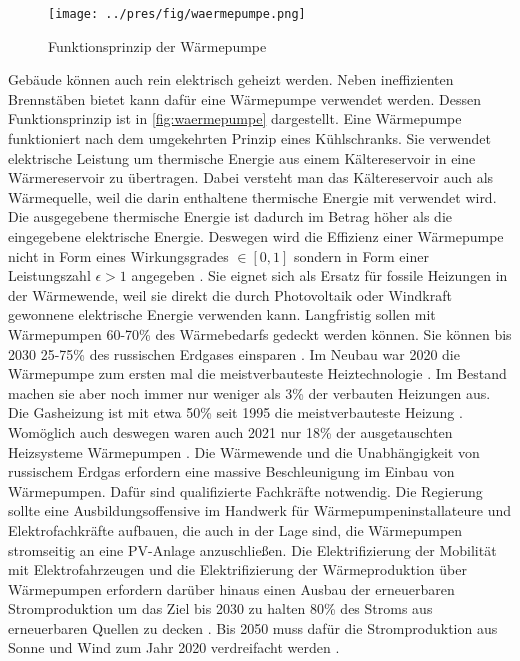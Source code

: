 \begin{figure}
\centering
\texttt{[image: ../pres/fig/waermepumpe.png]}
\caption{Funktionsprinzip der Wärmepumpe \cite{ei1}}
\label{fig:waermepumpe}
\end{figure}

Gebäude können auch rein elektrisch geheizt werden. Neben ineffizienten Brennstäben bietet kann dafür eine Wärmepumpe verwendet werden. Dessen Funktionsprinzip ist in \autoref{fig:waermepumpe} dargestellt. Eine Wärmepumpe funktioniert nach dem umgekehrten Prinzip eines Kühlschranks. Sie verwendet elektrische Leistung um thermische Energie aus einem Kältereservoir in eine Wärmereservoir zu übertragen. Dabei versteht man das Kältereservoir auch als Wärmequelle, weil die darin enthaltene thermische Energie mit verwendet wird. Die ausgegebene thermische Energie ist dadurch im Betrag höher als die eingegebene elektrische Energie. Deswegen wird die Effizienz einer Wärmepumpe nicht in Form eines Wirkungsgrades $\in [0,1]$ sondern in Form einer Leistungszahl $\epsilon > 1$ angegeben \cite{ei1}. Sie eignet sich als Ersatz für fossile Heizungen in der Wärmewende, weil sie direkt die durch Photovoltaik oder Windkraft gewonnene elektrische Energie verwenden kann. Langfristig sollen mit Wärmepumpen 60-70\% des Wärmebedarfs gedeckt werden können. Sie können bis 2030 25-75\% des russischen Erdgases einsparen \cite{clausen2022}. Im Neubau war 2020 die Wärmepumpe zum ersten mal die meistverbauteste Heiztechnologie \cite{statista-neubau-heizung}. Im Bestand machen sie aber noch immer nur weniger als 3\% der verbauten Heizungen aus. Die Gasheizung ist mit etwa 50\% seit 1995 die meistverbauteste Heizung \cite{statista-bestand-heizung}. Womöglich auch deswegen waren auch 2021 nur 18\% der ausgetauschten Heizsysteme Wärmepumpen \cite{clausen2022}. 
Die Wärmewende und die Unabhängigkeit von russischem Erdgas erfordern eine massive Beschleunigung im Einbau von Wärmepumpen. Dafür sind qualifizierte Fachkräfte notwendig. Die Regierung sollte eine Ausbildungsoffensive im Handwerk für Wärmepumpeninstallateure und Elektrofachkräfte aufbauen, die auch in der Lage sind, die Wärmepumpen stromseitig an eine PV-Anlage anzuschließen. 
Die Elektrifizierung der Mobilität mit Elektrofahrzeugen und die Elektrifizierung der Wärmeproduktion über Wärmepumpen erfordern darüber hinaus einen Ausbau der erneuerbaren Stromproduktion um das Ziel bis 2030 zu halten 80\% des Stroms aus erneuerbaren Quellen zu decken \cite{clausen2022}. Bis 2050 muss dafür die Stromproduktion aus Sonne und Wind zum Jahr 2020 verdreifacht werden \cite{agora-wasserstoff}.

